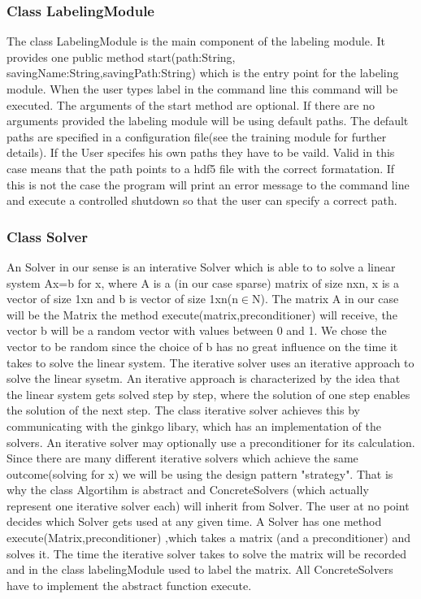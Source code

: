 \documentclass[parskip=full]{scrartcl}
\begin{document}
\subsubsection{Class LabelingModule}
The class LabelingModule is the main component of the labeling module. It provides one public method start(path:String, savingName:String,savingPath:String) which is the entry point for the labeling module. When the user types label in the command line this command will be executed. The arguments of the start method are optional. If there are no arguments provided the labeling module will be using default paths. The default paths are specified in a configuration file(see the training module for further details). If the User specifes his own paths they have to be vaild. Valid in this case means that the path points to a hdf5 file with the correct formatation. If this is not the case the program will print an error message to the command line and execute a controlled shutdown so that the user can specify a correct path.
\subsubsection{Class Solver}
An Solver in our sense is an interative Solver which is able to to solve a linear system Ax=b for x, where A is a (in our case sparse) matrix of size nxn, x is a vector of size 1xn and b is vector of size 1xn(n$\in$N). The matrix A in our case will be the Matrix the method execute(matrix,preconditioner) will receive, the vector b will be a random vector with values between 0 and 1. We chose the vector to be random since the choice of b has no great influence on the time it takes to solve the linear system.
The \gls{iterative solver} uses an iterative approach to solve the linear sysetm. An iterative approach is characterized by the idea that the linear system gets solved step by step, where the solution of one step enables the solution of the next step. The class \gls{iterative solver} achieves this by communicating with the ginkgo libary, which has an implementation of the solvers. An \gls{iterative solver} may optionally use a \gls{preconditioner} for its calculation. Since there are many different \gls{iterative solver}s which achieve the same outcome(solving for x) we will be using the design pattern "\gls{strategy}". That is why the class Algortihm is abstract and ConcreteSolvers (which actually represent one \gls{iterative solver} each) will inherit from Solver. The user at no point decides which Solver gets used at any given time. \newline
A Solver has one method execute(Matrix,\gls{preconditioner}) ,which takes a matrix (and a \gls{preconditioner}) and solves it. The time the \gls{iterative solver} takes to solve the matrix will be recorded and in the class labelingModule used to label the matrix. All ConcreteSolvers have to implement the abstract function execute.
\end{document}
